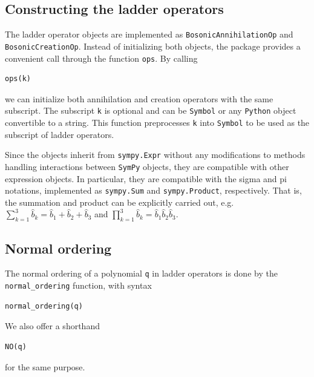 \documentclass[onecolumn, 12pt, sort&compress]{elsarticle}
\newcommand{\inlinecode}[1]{\texttt{#1}}
\newcommand{\bop}{\hat{b}}
\newenvironment{revision}{}{}
\newenvironment{revision2}{%
\color{red}
}
{}
\begin{document}

\subsection{Constructing the ladder operators}

\begin{revision}The ladder operator objects are implemented as \inlinecode{BosonicAnnihilationOp} and \inlinecode{BosonicCreationOp}. Instead of initializing both objects, the package provides a convenient call through the function \inlinecode{ops}.\end{revision} By calling
\begin{verbatim}
ops(k)
\end{verbatim}
we can initialize both annihilation and creation operators with the same subscript. The subscript \inlinecode{k} is optional and can be \inlinecode{Symbol} or any \texttt{Python} object convertible to a string. This function preprocesses \inlinecode{k} into \inlinecode{Symbol} to be used as the subscript of ladder operators. 

\begin{revision2}
Since the objects inherit from \inlinecode{sympy.Expr} without any modifications to methods handling interactions between \texttt{SymPy} objects, they are compatible with other expression objects. In particular, they are compatible with the sigma and pi notations, implemented as \inlinecode{sympy.Sum} and \inlinecode{sympy.Product}, respectively. That is, the summation and product can be explicitly carried out, e.g. $\sum_{k=1}^3 \bop_k = \bop_1+\bop_2+\bop_3$ and $\prod_{k=1}^3 \bop_k = \bop_1\bop_2\bop_3$.
\end{revision2}

\subsection{Normal ordering}
\label{subsec_normal_ordering}

The normal ordering of a polynomial \inlinecode{q} in ladder operators is done by the \inlinecode{normal_ordering} function, with syntax
\begin{verbatim}
normal_ordering(q)
\end{verbatim}
We also offer a shorthand
\begin{verbatim}
NO(q)
\end{verbatim}
for the same purpose.  
\end{document}
